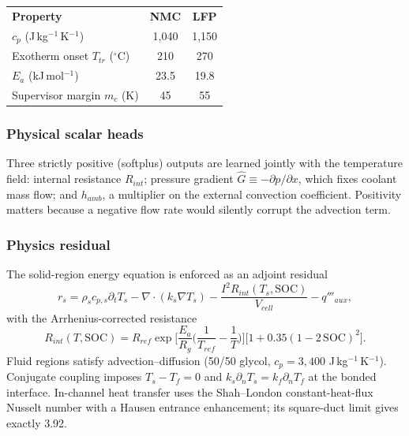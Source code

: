 \documentclass[10.5pt,a4paper]{article}
\begin{document}
\begin{center}
\small
{}
\begin{tabular}{@{}lcc@{}}
\rowcolor{navy}
\color{white}\bfseries Property & \color{white}\bfseries NMC & \color{white}\bfseries LFP \\
$c_p$ (J\,kg$^{-1}$\,K$^{-1}$) & 1,040 & 1,150 \\
Exotherm onset $T_{tr}$ ($^\circ$C) & 210 & 270 \\
$E_a$ (kJ\,mol$^{-1}$) & 23.5 & 19.8 \\
Supervisor margin $m_c$ (K) & 45 & 55 \\
\bottomrule
\end{tabular}
\end{center}

\subsubsection*{Physical scalar heads}
Three strictly positive (softplus) outputs are learned jointly with the temperature field: internal resistance $R_{int}$; pressure gradient $\hat G\equiv-\partial p/\partial x$, which fixes coolant mass flow; and $h_{amb}$, a multiplier on the external convection coefficient. Positivity matters because a negative flow rate would silently corrupt the advection term.

\subsubsection*{Physics residual}
The solid-region energy equation is enforced as an adjoint residual
\begin{equation}
  r_s=\rho_s c_{p,s}\partial_t T_s-\nabla\!\cdot(k_s\nabla T_s)-\frac{I^2R_{int}(T_s,\mathrm{SOC})}{V_{cell}}-q'''_{aux},
\end{equation}
with the Arrhenius-corrected resistance
\begin{equation}
  R_{int}(T,\mathrm{SOC})=R_{ref}\exp\!\Big[\frac{E_a}{R_g}\Big(\frac{1}{T_{ref}}-\frac{1}{T}\Big)\Big]\big[1+0.35(1-2\,\mathrm{SOC})^2\big].
\end{equation}
Fluid regions satisfy advection--diffusion (50/50 glycol, $c_p=3{,}400$ J\,kg$^{-1}$\,K$^{-1}$). Conjugate coupling imposes $T_s-T_f=0$ and $k_s\partial_n T_s=k_f\partial_n T_f$ at the bonded interface. In-channel heat transfer uses the Shah--London constant-heat-flux Nusselt number with a Hausen entrance enhancement; its square-duct limit gives exactly 3.92.
\end{document}
